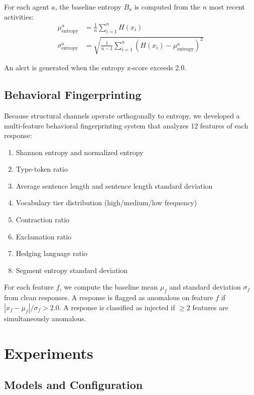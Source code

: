 \documentclass[11pt]{article}
\begin{document}
For each agent $a$, the baseline entropy $B_a$ is computed from the $n$
most recent activities:
\begin{align}
  \mu_{\text{entropy}}^a &= \frac{1}{n} \sum_{i=1}^{n} H(x_i) \\
  \sigma_{\text{entropy}}^a &= \sqrt{\frac{1}{n-1} \sum_{i=1}^{n} (H(x_i) - \mu_{\text{entropy}}^a)^2}
\end{align}

An alert is generated when the entropy z-score exceeds 2.0.

\subsection{Behavioral Fingerprinting}

Because structural channels operate orthogonally to entropy, we developed a
multi-feature behavioral fingerprinting system that analyzes 12 features of
each response:

\begin{enumerate}
  \item Shannon entropy and normalized entropy
  \item Type-token ratio
  \item Average sentence length and sentence length standard deviation
  \item Vocabulary tier distribution (high/medium/low frequency)
  \item Contraction ratio
  \item Exclamation ratio
  \item Hedging language ratio
  \item Segment entropy standard deviation
\end{enumerate}

For each feature $f$, we compute the baseline mean $\mu_f$ and standard
deviation $\sigma_f$ from clean responses. A response is flagged as
anomalous on feature $f$ if $|x_f - \mu_f| / \sigma_f > 2.0$. A response
is classified as injected if $\geq 2$ features are simultaneously
anomalous.

\section{Experiments}
\label{sec:experiments}

\subsection{Models and Configuration}
\end{document}
